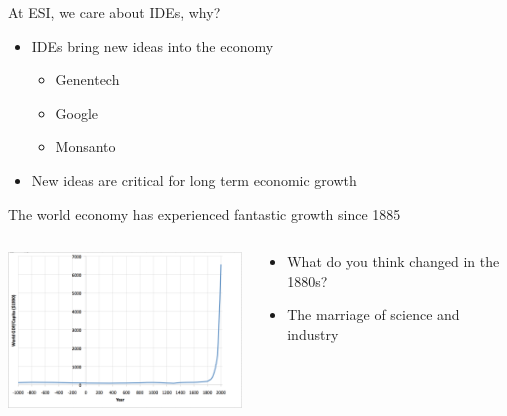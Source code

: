 \documentclass{beamer}
\begin{document}
\begin{frame}{At ESI, we care about IDEs, why?}
  \pause
  \begin{itemize}
      \item{IDEs bring new ideas into the economy
      \begin{itemize}
          \item{Genentech}
          \item{Google}
          \item{Monsanto}
      \end{itemize}
      }
      \item{New ideas are critical for long term economic growth}
  \end{itemize}
\end{frame}

\begin{frame}{The world economy has experienced fantastic growth since 1885}
  \begin{columns}[T]
    \begin{column}{7cm}
    \includegraphics[width=7cm]{WorldGrowth.png}
    \end{column} 
    \begin{column}{.5\textwidth}
    \begin{itemize}
        \item{What do you think changed in the 1880s?
        \pause
        }
        \item{
        The marriage of science and industry 
        }
    \end{itemize}
    \end{column}
  \end{columns}
\end{frame}
\end{document}

